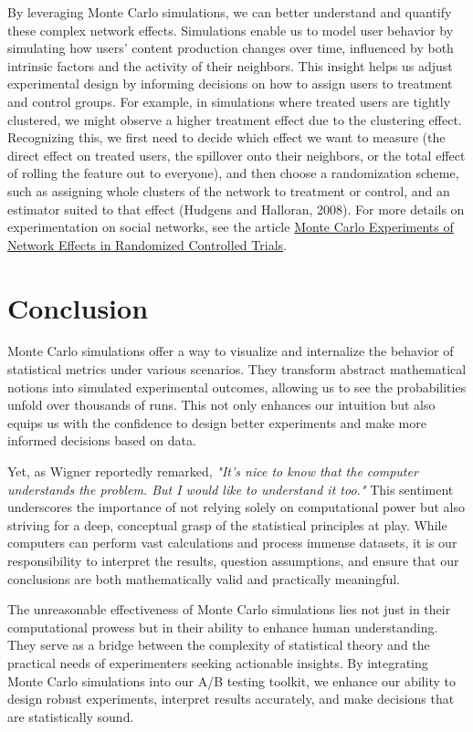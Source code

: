 \documentclass[final,5p,times,twocolumn,authoryear]{elsarticle}
\begin{document}
By leveraging Monte Carlo simulations, we can better understand and quantify these complex network effects. Simulations enable us to model user behavior by simulating how users' content production changes over time, influenced by both intrinsic factors and the activity of their neighbors. This insight helps us adjust experimental design by informing decisions on how to assign users to treatment and control groups. For example, in simulations where treated users are tightly clustered, we might observe a higher treatment effect due to the clustering effect. Recognizing this, we first need to decide which effect we want to measure (the direct effect on treated users, the spillover onto their neighbors, or the total effect of rolling the feature out to everyone), and then choose a randomization scheme, such as assigning whole clusters of the network to treatment or control, and an estimator suited to that effect (Hudgens and Halloran, 2008). For more details on experimentation on social networks, see the article \href{https://arxiv.org/abs/2312.01607}{Monte Carlo Experiments of Network Effects in Randomized Controlled Trials}.

\section{Conclusion}

Monte Carlo simulations offer a way to visualize and internalize the behavior of statistical metrics under various scenarios. They transform abstract mathematical notions into simulated experimental outcomes, allowing us to see the probabilities unfold over thousands of runs. This not only enhances our intuition but also equips us with the confidence to design better experiments and make more informed decisions based on data.

Yet, as Wigner reportedly remarked, \textit{"It's nice to know that the computer understands the problem. But I would like to understand it too."} This sentiment underscores the importance of not relying solely on computational power but also striving for a deep, conceptual grasp of the statistical principles at play. While computers can perform vast calculations and process immense datasets, it is our responsibility to interpret the results, question assumptions, and ensure that our conclusions are both mathematically valid and practically meaningful.

The unreasonable effectiveness of Monte Carlo simulations lies not just in their computational prowess but in their ability to enhance human understanding. They serve as a bridge between the complexity of statistical theory and the practical needs of experimenters seeking actionable insights. By integrating Monte Carlo simulations into our A/B testing toolkit, we enhance our ability to design robust experiments, interpret results accurately, and make decisions that are statistically sound. 
\end{document}
